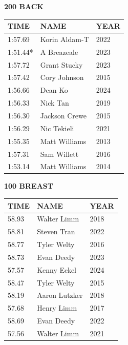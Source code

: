 \begin{table}[H]
\centering
\begin{minipage}[t]{0.48\textwidth}
\centering
\textbf{200 BACK}\\[0.1cm]
\begin{tabular}{@{}p{1.8cm}p{2.8cm}p{1.2cm}@{}}
\hline
    \textbf{TIME} & \textbf{NAME} & \textbf{YEAR} \\
\hline
    1:57.69 & Korin Aldam-T & 2022 \\
    1:51.44* & A Breazeale & 2023 \\
    1:57.72 & Grant Stucky & 2023 \\
    1:57.42 & Cory Johnson & 2015 \\
    1:56.66 & Dean Ko & 2024 \\
    1:56.33 & Nick Tan & 2019 \\
    1:56.30 & Jackson Crewe & 2015 \\
    1:56.29 & Nic Tekieli & 2021 \\
    1:55.35 & Matt Williams & 2013 \\
    1:57.31 & Sam Willett & 2016 \\
    1:53.14 & Matt Williams & 2014 \\
\hline
\end{tabular}
\end{minipage}\hfill
\begin{minipage}[t]{0.48\textwidth}
\centering
\textbf{100 BREAST}\\[0.1cm]
\begin{tabular}{@{}p{1.8cm}p{2.8cm}p{1.2cm}@{}}
\hline
    \textbf{TIME} & \textbf{NAME} & \textbf{YEAR} \\
\hline
    58.93 & Walter Limm & 2018 \\
    58.81 & Steven Tran & 2022 \\
    58.77 & Tyler Welty & 2016 \\
    58.73 & Evan Deedy & 2023 \\
    57.57 & Kenny Eckel & 2024 \\
    58.47 & Tyler Welty & 2015 \\
    58.19 & Aaron Lutzker & 2018 \\
    57.68 & Henry Limm & 2017 \\
    58.69 & Evan Deedy & 2022 \\
    57.56 & Walter Limm & 2021 \\
\hline
\end{tabular}
\end{minipage}
\end{table}

